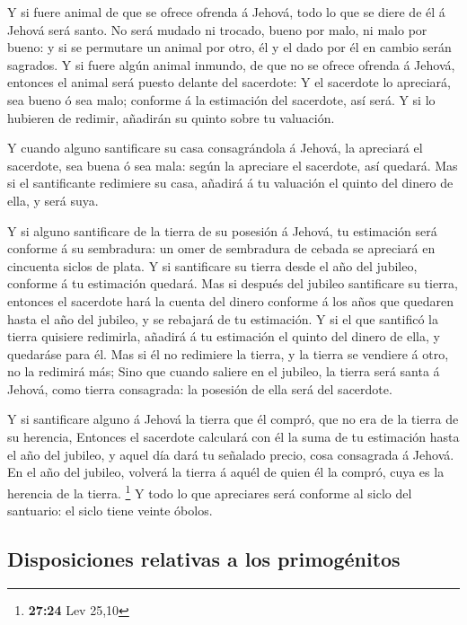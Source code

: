  Y si fuere animal de que se ofrece ofrenda á Jehová, todo
lo que se diere de él á Jehová será santo.  No será mudado
ni trocado, bueno por malo, ni malo por bueno: y si se permutare un
animal por otro, él y el dado por él en cambio serán sagrados.
 Y si fuere algún animal inmundo, de que no se ofrece
ofrenda á Jehová, entonces el animal será puesto delante del sacerdote:
 Y el sacerdote lo apreciará, sea bueno ó sea malo;
conforme á la estimación del sacerdote, así será.  Y si lo
hubieren de redimir, añadirán su quinto sobre tu valuación.

 Y cuando alguno santificare su casa consagrándola á
Jehová, la apreciará el sacerdote, sea buena ó sea mala: según la
apreciare el sacerdote, así quedará.  Mas si el
santificante redimiere su casa, añadirá á tu valuación el quinto del
dinero de ella, y será suya.

 Y si alguno santificare de la tierra de su posesión á
Jehová, tu estimación será conforme á su sembradura: un omer de
sembradura de cebada se apreciará en cincuenta siclos de plata.
 Y si santificare su tierra desde el año del jubileo,
conforme á tu estimación quedará.  Mas si después del
jubileo santificare su tierra, entonces el sacerdote hará la cuenta del
dinero conforme á los años que quedaren hasta el año del jubileo, y se
rebajará de tu estimación.  Y si el que santificó la tierra
quisiere redimirla, añadirá á tu estimación el quinto del dinero de
ella, y quedaráse para él.  Mas si él no redimiere la
tierra, y la tierra se vendiere á otro, no la redimirá más;
 Sino que cuando saliere en el jubileo, la tierra será
santa á Jehová, como tierra consagrada: la posesión de ella será del
sacerdote.

 Y si santificare alguno á Jehová la tierra que él compró,
que no era de la tierra de su herencia,  Entonces el
sacerdote calculará con él la suma de tu estimación hasta el año del
jubileo, y aquel día dará tu señalado precio, cosa consagrada á Jehová.
 En el año del jubileo, volverá la tierra á aquél de quien
él la compró, cuya es la herencia de la tierra. \footnote{\textbf{27:24}
  Lev 25,10}  Y todo lo que apreciares será conforme al
siclo del santuario: el siclo tiene veinte óbolos.

\hypertarget{disposiciones-relativas-a-los-primoguxe9nitos}{%
\subsection{Disposiciones relativas a los
primogénitos}\label{disposiciones-relativas-a-los-primoguxe9nitos}}

